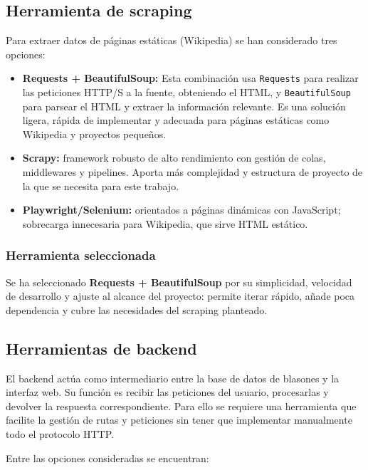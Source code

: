 \subsection{Herramienta de scraping}\label{sec:scraping}
Para extraer datos de páginas estáticas (Wikipedia) se han considerado tres opciones:

\begin{itemize}
  \item \textbf{Requests + BeautifulSoup:} Esta combinación usa \texttt{Requests} para realizar las peticiones 
  HTTP/S a la fuente, obteniendo el HTML, y \texttt{BeautifulSoup} para parsear el HTML y extraer la información 
  relevante. Es una solución ligera, rápida de implementar y adecuada para páginas estáticas como Wikipedia y
  proyectos pequeños.
  \item \textbf{Scrapy:} framework robusto de alto rendimiento con gestión de colas, middlewares y pipelines.
  Aporta más complejidad y estructura de proyecto de la que se necesita para este trabajo.
  \item \textbf{Playwright/Selenium:} orientados a páginas dinámicas con JavaScript; sobrecarga innecesaria para 
  Wikipedia, que sirve HTML estático.
\end{itemize}

\subsubsection{Herramienta seleccionada}
Se ha seleccionado \textbf{Requests + BeautifulSoup} por su simplicidad, velocidad de desarrollo y ajuste al alcance 
del proyecto: permite iterar rápido, añade poca dependencia y cubre las necesidades del scraping planteado.

\subsection{Herramientas de backend}
El backend actúa como intermediario entre la base de datos de blasones y la interfaz web. 
Su función es recibir las peticiones del usuario, procesarlas y devolver la respuesta correspondiente.  
Para ello se requiere una herramienta que facilite la gestión de rutas y peticiones sin tener que implementar 
manualmente todo el protocolo HTTP.

Entre las opciones consideradas se encuentran:


